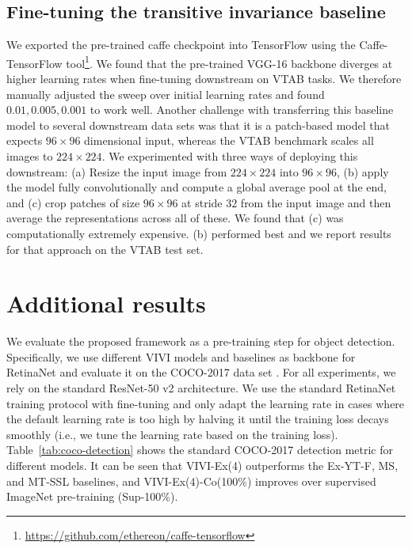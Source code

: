 \documentclass[10pt,twocolumn,letterpaper]{article}
\renewcommand{\paragraph}[1]{\noindent{\bf #1}\quad}
\begin{document}
\subsection{Fine-tuning the transitive invariance baseline}
We exported the pre-trained caffe checkpoint into TensorFlow using the Caffe-TensorFlow tool\footnote{\url{https://github.com/ethereon/caffe-tensorflow}}. We found that the pre-trained VGG-16 backbone diverges at higher learning rates when fine-tuning downstream on VTAB tasks. We therefore manually adjusted the sweep over initial learning rates and found $0.01, 0.005, 0.001$ to work well. Another challenge with transferring this baseline model to several downstream data sets was that it is a patch-based model that expects $96 \times 96$ dimensional input, whereas the VTAB benchmark scales all images to $224 \times 224$. We experimented with three ways of deploying this downstream: (a) Resize the input image from $224 \times 224$ into $96 \times 96$, (b) apply the model fully convolutionally and compute a global average pool at the end, and (c) crop patches of size $96 \times 96$ at stride $32$ from the input image and then average the representations across all of these. We found that (c) was computationally extremely expensive. (b) performed best and we report results for that approach on the VTAB test set.

\clearpage

\FloatBarrier

\section{Additional results}

\paragraph{Object detection} We evaluate the proposed framework as a pre-training step for object detection. Specifically, we use different VIVI models and baselines as backbone for RetinaNet \cite{lin2017focal} and evaluate it on the COCO-2017 data set \cite{lin2014microsoft}. For all experiments, we rely on the standard ResNet-50 v2 architecture. We use the standard RetinaNet training protocol with fine-tuning and only adapt the learning rate in cases where the default learning rate is too high by halving it until the training loss decays smoothly (i.e., we tune the learning rate based on the training loss). Table~\ref{tab:coco-detection} shows the standard COCO-2017 detection metric for different models. It can be seen that VIVI-Ex(4) outperforms the Ex-YT-F, MS, and MT-SSL baselines, and VIVI-Ex(4)-Co(100\%) improves over supervised ImageNet pre-training (Sup-100\%).
\end{document}

